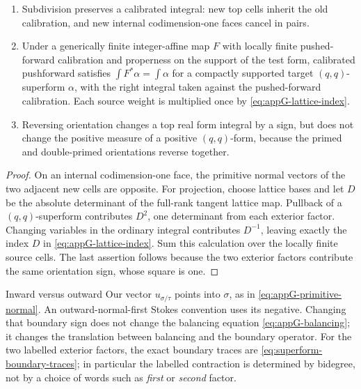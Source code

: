 \begin{proposition}\label{prop:appG-calibration-tests}
\begin{enumerate}
\item Subdivision preserves a calibrated integral: new top cells inherit the
      old calibration, and new internal codimension-one faces cancel in
      pairs.
\item Under a generically finite integer-affine map \(F\) with locally
      finite pushed-forward calibration and properness on the support
      of the test form, calibrated
      pushforward satisfies \(\int F^*\alpha=\int\alpha\) for a
      compactly supported target \((q,q)\)-superform \(\alpha\), with
      the right integral taken against the pushed-forward calibration.
      Each source weight is multiplied once by
      \eqref{eq:appG-lattice-index}.
\item Reversing orientation changes a top real form integral by a sign, but
      does not change the positive measure of a positive \((q,q)\)-form,
      because the primed and double-primed orientations reverse together.
\end{enumerate}
\par
\end{proposition}

\begin{proof}
On an internal codimension-one face, the primitive normal vectors of the two
adjacent new cells are opposite.
For projection, choose lattice bases and let \(D\) be the absolute
determinant of the full-rank tangent lattice map.  Pullback of a
\((q,q)\)-superform contributes \(D^2\), one determinant from each
exterior factor.  Changing variables in the ordinary integral contributes
\(D^{-1}\), leaving exactly the index \(D\) in
\eqref{eq:appG-lattice-index}.  Sum this calculation over the locally
finite source cells.
The last assertion follows because the two exterior factors contribute the
same orientation sign, whose square is one.
\end{proof}

\begin{warning}{Inward versus outward}
\label{warn:appG-boundary-orientation}
Our vector \(u_{\sigma/\tau}\) points into \(\sigma\), as in
\eqref{eq:appG-primitive-normal}.
An outward-normal-first Stokes convention uses its negative.
Changing that boundary sign does not change the balancing equation
\eqref{eq:appG-balancing}; it changes the translation between balancing and
the boundary operator.  For the two labelled exterior factors, the exact
boundary traces are \eqref{eq:superform-boundary-traces}; in particular the
labelled contraction is determined by bidegree, not by a choice of words
such as \emph{first} or \emph{second} factor.
\end{warning}

